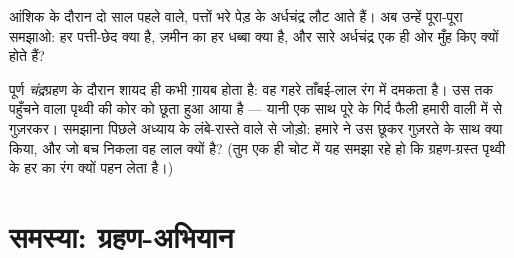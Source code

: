 \begin{exercise}[$\star\star$]\label{exo:g7:shadows-eclipses:11}
आंशिक  के दौरान दो साल पहले वाले, पत्तों भरे पेड़ के
अर्धचंद्र लौट आते हैं। अब उन्हें पूरा-पूरा समझाओ: हर पत्ती-छेद क्या
है, ज़मीन का हर धब्बा क्या है, और सारे अर्धचंद्र एक ही ओर मुँह किए
क्यों होते हैं?
\end{exercise}

\begin{exercise}[$\star\star\star$]\label{exo:g7:shadows-eclipses:12}
पूर्ण \emph{चंद्र}ग्रहण के दौरान  शायद ही कभी ग़ायब होता है: वह
गहरे ताँबई-लाल रंग में दमकता है। उस तक पहुँचने वाला  पृथ्वी की
कोर को छूता हुआ आया है --- यानी एक साथ पूरे  के गिर्द फैली हमारी
 वाली  में से गुज़रकर। समझाना पिछले अध्याय के लंबे-रास्ते
वाले  से जोड़ो: हमारे  ने उस छूकर गुज़रते  के साथ
क्या किया, और जो  बच निकला वह लाल क्यों है? (तुम एक ही चोट में
यह समझा रहे हो कि ग्रहण-ग्रस्त  पृथ्वी के हर  का रंग
क्यों पहन लेता है।)
\end{exercise}

\section{समस्या: ग्रहण-अभियान}

